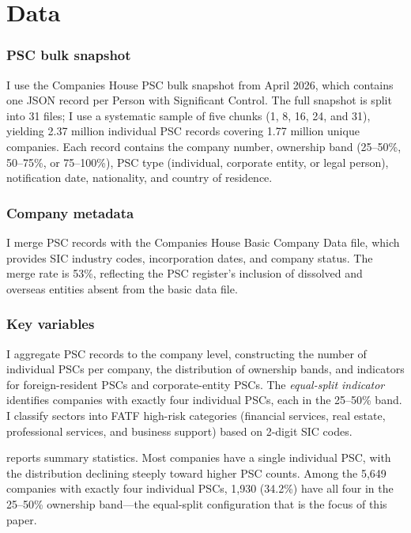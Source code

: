 \documentclass[12pt]{article}
\begin{document}
\section{Data}
\label{sec:data}

\subsubsection*{PSC bulk snapshot} I use the Companies House PSC bulk snapshot from April 2026, which contains one JSON record per Person with Significant Control. The full snapshot is split into 31 files; I use a systematic sample of five chunks (1, 8, 16, 24, and 31), yielding 2.37 million individual PSC records covering 1.77 million unique companies. Each record contains the company number, ownership band (25--50\%, 50--75\%, or 75--100\%), PSC type (individual, corporate entity, or legal person), notification date, nationality, and country of residence.

\subsubsection*{Company metadata} I merge PSC records with the Companies House Basic Company Data file, which provides SIC industry codes, incorporation dates, and company status. The merge rate is 53\%, reflecting the PSC register's inclusion of dissolved and overseas entities absent from the basic data file.

\subsubsection*{Key variables} I aggregate PSC records to the company level, constructing the number of individual PSCs per company, the distribution of ownership bands, and indicators for foreign-resident PSCs and corporate-entity PSCs. The \textit{equal-split indicator} identifies companies with exactly four individual PSCs, each in the 25--50\% band. I classify sectors into FATF high-risk categories (financial services, real estate, professional services, and business support) based on 2-digit SIC codes.

 reports summary statistics. Most companies have a single individual PSC, with the distribution declining steeply toward higher PSC counts. Among the 5,649 companies with exactly four individual PSCs, 1,930 (34.2\%) have all four in the 25--50\% ownership band---the equal-split configuration that is the focus of this paper.
\end{document}
